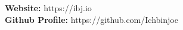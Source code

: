 \noindent
\textbf{Website:} https://ibj.io \\
\noindent
\textbf{Github Profile:} https://github.com/Ichbinjoe
